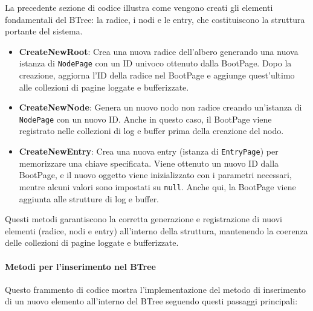 \documentclass[12pt,a4paper,openright,twoside]{book}
\begin{document}
                    La precedente sezione di codice illustra come vengono creati gli elementi fondamentali del BTree: la radice, i nodi e le entry, che costituiscono la struttura portante del sistema.

                    \begin{itemize}
                        \item \textbf{CreateNewRoot}: Crea una nuova radice dell'albero generando una nuova istanza di \texttt{NodePage} con un ID univoco ottenuto dalla BootPage.
                        Dopo la creazione, aggiorna l'ID della radice nel BootPage e aggiunge quest'ultimo alle collezioni di pagine loggate e bufferizzate.
                        \item \textbf{CreateNewNode}: Genera un nuovo nodo non radice creando un'istanza di \texttt{NodePage} con un nuovo ID.
                        Anche in questo caso, il BootPage viene registrato nelle collezioni di log e buffer prima della creazione del nodo.
                        \item \textbf{CreateNewEntry}: Crea una nuova entry (istanza di \texttt{EntryPage}) per memorizzare una chiave specificata.
                        Viene ottenuto un nuovo ID dalla BootPage, e il nuovo oggetto viene inizializzato con i parametri necessari, mentre alcuni valori sono impostati su \texttt{null}.
                        Anche qui, la BootPage viene aggiunta alle strutture di log e buffer.
                    \end{itemize}

                    Questi metodi garantiscono la corretta generazione e registrazione di nuovi elementi (radice, nodi e entry) all'interno della struttura, mantenendo la coerenza delle collezioni di pagine loggate e bufferizzate.

                \paragraph{Metodi per l'inserimento nel BTree}

                    

                    Questo frammento di codice mostra l'implementazione del metodo di inserimento di un nuovo elemento all'interno del BTree seguendo questi passaggi principali:
\end{document}
